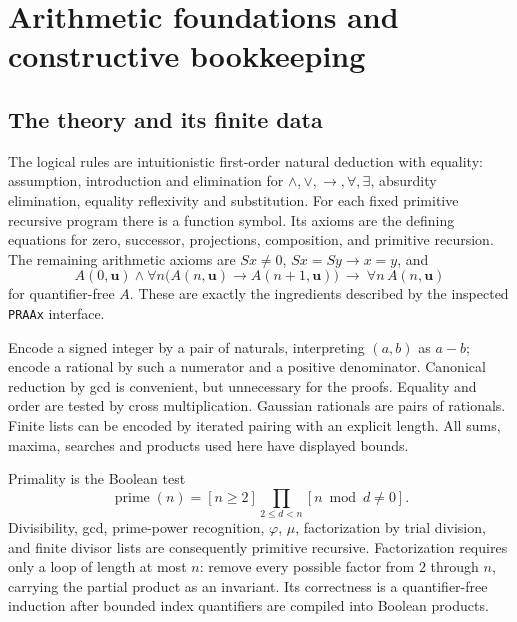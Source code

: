\section{Arithmetic foundations and constructive bookkeeping}
\label{sec:foundations}

\subsection{The theory and its finite data}

The logical rules are intuitionistic first-order natural deduction with equality: assumption, introduction and elimination for $\land,\lor,\to,\forall,\exists$, absurdity elimination, equality reflexivity and substitution. For each fixed primitive recursive program there is a function symbol. Its axioms are the defining equations for zero, successor, projections, composition, and primitive recursion. The remaining arithmetic axioms are $Sx\ne0$, $Sx=Sy\to x=y$, and
\[
 A(0,\mathbf u)\land\forall n\bigl(A(n,\mathbf u)\to A(n+1,\mathbf u)\bigr)
 \ \longrightarrow\ \forall n\,A(n,\mathbf u)
\]
for quantifier-free $A$. These are exactly the ingredients described by the inspected \texttt{PRAAx} interface.

Encode a signed integer by a pair of naturals, interpreting $(a,b)$ as $a-b$; encode a rational by such a numerator and a positive denominator. Canonical reduction by gcd is convenient, but unnecessary for the proofs. Equality and order are tested by cross multiplication. Gaussian rationals are pairs of rationals. Finite lists can be encoded by iterated pairing with an explicit length. All sums, maxima, searches and products used here have displayed bounds.

Primality is the Boolean test
\[
 \operatorname{prime}(n)=[n\geq2]\prod_{2\leq d<n}[n\bmod d\ne0].
\]
Divisibility, gcd, prime-power recognition, $\varphi$, $\mu$, factorization by trial division, and finite divisor lists are consequently primitive recursive. Factorization requires only a loop of length at most $n$: remove every possible factor from $2$ through $n$, carrying the partial product as an invariant. Its correctness is a quantifier-free induction after bounded index quantifiers are compiled into Boolean products.

